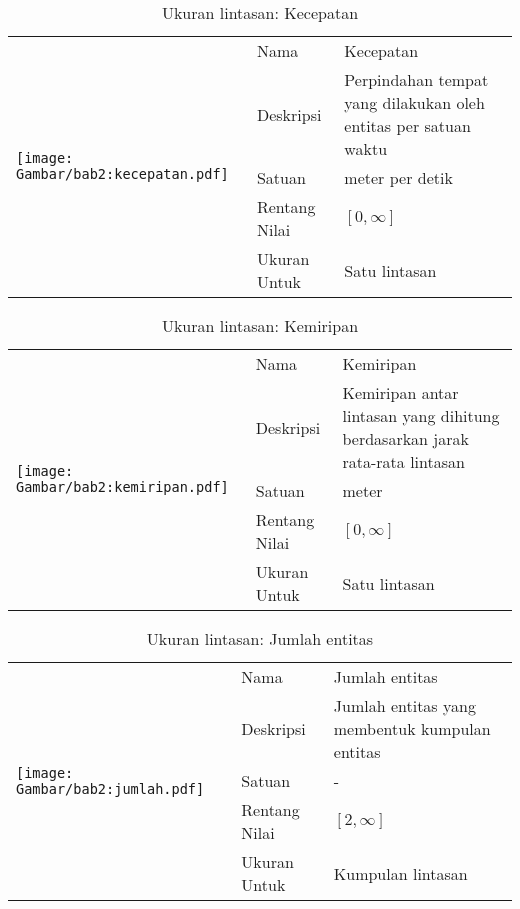 \begin{table}[htbp]
    \centering
    \caption{Ukuran lintasan: Kecepatan}
    \begin{tabular}{|m{4cm}|l|p{8.5cm}|} 
        \hline
        \multirow{5}{*}{
            \texttt{[image: Gambar/bab2:kecepatan.pdf]}
        } & Nama & Kecepatan \\ 
        \cline{2-3}
        & Deskripsi & Perpindahan tempat yang dilakukan oleh entitas per satuan waktu                    \\ 
        \cline{2-3}
        & Satuan & meter per detik                   \\ 
        \cline{2-3}
        & Rentang Nilai & $[0, \infty]$                    \\ 
        \cline{2-3}
        & Ukuran Untuk & Satu lintasan                    \\
        \hline
    \end{tabular}
    \label{bab2:ukuran-kecepatan}
\end{table}

\begin{table}[htbp]
    \centering
    \caption{Ukuran lintasan: Kemiripan}
    \begin{tabular}{|m{4cm}|l|p{8.5cm}|} 
        \hline
        \multirow{5}{*}{
            \texttt{[image: Gambar/bab2:kemiripan.pdf]}
        } & Nama & Kemiripan \\ 
        \cline{2-3}
        & Deskripsi & Kemiripan antar lintasan yang dihitung berdasarkan jarak rata-rata lintasan                     \\ 
        \cline{2-3}
        & Satuan & meter                   \\ 
        \cline{2-3}
        & Rentang Nilai & $[0, \infty]$                    \\ 
        \cline{2-3}
        & Ukuran Untuk & Satu lintasan                    \\
        \hline
    \end{tabular}
    \label{bab2:ukuran-kemiripan}
\end{table}

\begin{table}[htbp]
    \centering
    \caption{Ukuran lintasan: Jumlah entitas}
    \begin{tabular}{|m{4cm}|l|p{8.5cm}|} 
        \hline
        \multirow{5}{*}{
            \texttt{[image: Gambar/bab2:jumlah.pdf]}
        } & Nama & Jumlah entitas \\ 
        \cline{2-3}
        & Deskripsi & Jumlah entitas yang membentuk kumpulan entitas                     \\ 
        \cline{2-3}
        & Satuan & -                   \\ 
        \cline{2-3}
        & Rentang Nilai & $[2, \infty]$                    \\ 
        \cline{2-3}
        & Ukuran Untuk & Kumpulan lintasan                    \\
        \hline
    \end{tabular}
    \label{bab2:ukuran-jumlah}
\end{table}

